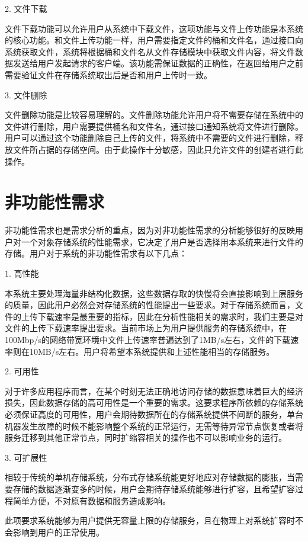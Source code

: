 2. 文件下载

文件下载功能可以允许用户从系统中下载文件，这项功能与文件上传功能是本系统的核心功能。和文件上传功能一样，用户需要指定文件的桶和文件名，通过接口向系统获取文件，系统将根据桶和文件名从文件存储模块中获取文件内容，将文件数据发送给用户发起请求的客户端。该功能需保证数据的正确性，在返回给用户之前需要验证文件在存储系统取出后是否和用户上传时一致。

3. 文件删除

文件删除功能是比较容易理解的。文件删除功能允许用户将不需要存储在系统中的文件进行删除，用户需要提供桶名和文件名，通过接口通知系统将文件进行删除。用户可以通过这个功能删除自己上传的文件，将系统中不需要的文件进行删除，释放文件所占据的存储空间。由于此操作十分敏感，因此只允许文件的创建者进行此操作。

\section{非功能性需求}
非功能性需求也是需求分析的重点，因为对非功能性需求的分析能够很好的反映用户对一个对象存储系统的性能需求，它决定了用户是否选择用本系统来进行文件的存储。用户对于系统的非功能性需求有以下几点：

1. 高性能

本系统主要处理海量非结构化数据，这些数据存取的快慢将会直接影响到上层服务的质量，因此用户必然会对存储系统的性能提出一些要求。对于存储系统而言，文件的上传下载速率是最重要的指标，因此在分析性能相关的需求时，我们主要是对文件的上传下载速率提出要求。当前市场上为用户提供服务的存储系统中，在100Mbp/s的网络带宽环境中文件上传速率普遍达到了1MB/s左右，文件的下载速率则在10MB/s左右。用户将希望本系统提供和上述性能相当的存储服务。

2. 可用性

对于许多应用程序而言，在某个时刻无法正确地访问存储的数据意味着巨大的经济损失，因此数据存储的高可用性是一个重要的需求。这要求程序所依赖的存储系统必须保证高度的可用性，用户会期待数据所在的存储系统提供不间断的服务，单台机器发生故障的时候不能影响整个系统的正常运行，无需等待异常节点恢复或者将服务迁移到其他正常节点，同时扩缩容相关的操作也不可以影响业务的运行。

3. 可扩展性

相较于传统的单机存储系统，分布式存储系统能更好地应对存储数据的膨胀，当需要存储的数据逐渐变多的时候，用户会期待存储系统能够进行扩容，且希望扩容过程简单方便，不对原有数据和服务造成影响。

此项要求系统能够为用户提供无容量上限的存储服务，且在物理上对系统扩容时不会影响到用户的正常使用。

